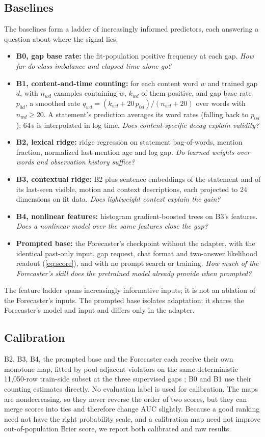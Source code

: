 \documentclass[10pt]{article}
\begin{document}
\subsection{Baselines}
The baselines form a ladder of increasingly informed predictors, each answering a question about where the signal lies.
\begin{itemize}
\item \textbf{B0, gap base rate:} the fit-population positive frequency at each gap. \emph{How far do class imbalance and elapsed time alone go?}
\item \textbf{B1, content-and-time counting:} for each content word $w$ and trained gap $d$, with $n_{wd}$ examples containing $w$, $k_{wd}$ of them positive, and gap base rate $p_{0d}$, a smoothed rate $q_{wd} = (k_{wd} + 20\,p_{0d})/(n_{wd}+20)$ over words with $n_{wd}\ge 20$. A statement's prediction averages its word rates (falling back to $p_{0d}$); 64\,s is interpolated in log time. \emph{Does content-specific decay explain validity?}
\item \textbf{B2, lexical ridge:} ridge regression on statement bag-of-words, mention fraction, normalized last-mention age and log gap. \emph{Do learned weights over words and observation history suffice?}
\item \textbf{B3, contextual ridge:} B2 plus sentence embeddings \citep{reimers2019sentence,wang2020minilm} of the statement and of its last-seen visible, motion and context descriptions, each projected to 24 dimensions on fit data. \emph{Does lightweight context explain the gain?}
\item \textbf{B4, nonlinear features:} histogram gradient-boosted trees on B3's features. \emph{Does a nonlinear model over the same features close the gap?}
\item \textbf{Prompted base:} the Forecaster's checkpoint without the adapter, with the identical past-only input, gap request, chat format and two-answer likelihood readout (\cref{eq:score}), and with no prompt search or training. \emph{How much of the Forecaster's skill does the pretrained model already provide when prompted?}
\end{itemize}
The feature ladder spans increasingly informative inputs; it is not an ablation of the Forecaster's inputs. The prompted base isolates adaptation: it shares the Forecaster's model and input and differs only in the adapter.

\subsection{Calibration}
B2, B3, B4, the prompted base and the Forecaster each receive their own monotone map, fitted by pool-adjacent-violators on the same deterministic 11,050-row train-side subset at the three supervised gaps \citep{zadrozny2002transforming}; B0 and B1 use their counting estimates directly. No evaluation label is used for calibration. The maps are nondecreasing, so they never reverse the order of two scores, but they can merge scores into ties and therefore change AUC slightly. Because a good ranking need not have the right probability scale, and a calibration map need not improve out-of-population Brier score, we report both calibrated and raw results.
\end{document}
